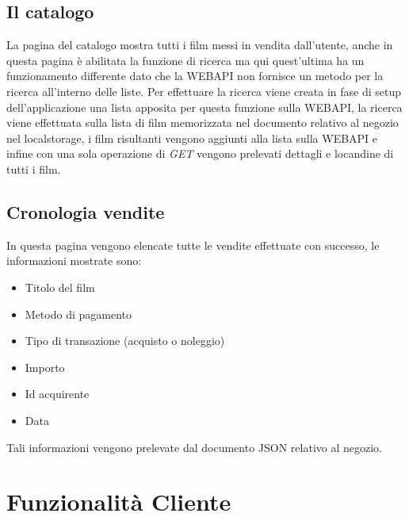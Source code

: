 \documentclass{article}
\begin{document}
    \subsection{Il catalogo}
    La pagina del catalogo mostra tutti i film messi in vendita dall'utente, anche in questa pagina è abilitata la funzione di ricerca ma qui quest'ultima ha un funzionamento differente dato che 
    la WEBAPI non fornisce un metodo per la ricerca all'interno delle liste.
    Per effettuare la ricerca viene creata in fase di setup dell'applicazione una lista apposita per questa funzione sulla WEBAPI, la ricerca viene effettuata sulla lista di film
    memorizzata nel documento relativo al negozio nel localstorage, i film risultanti vengono aggiunti alla lista sulla WEBAPI e infine con una sola operazione di \emph{GET} vengono prelevati dettagli e locandine di tutti i film.

    \subsection{Cronologia vendite}
    In questa pagina vengono elencate tutte le vendite effettuate con successo, le informazioni mostrate sono:
    \begin{itemize}
        \item Titolo del film
        \item Metodo di pagamento
        \item Tipo di transazione (acquisto o noleggio)
        \item Importo
        \item Id acquirente
        \item Data
    \end{itemize}
    Tali informazioni vengono prelevate dal documento JSON relativo al negozio.

\section{Funzionalità Cliente}
\end{document}
